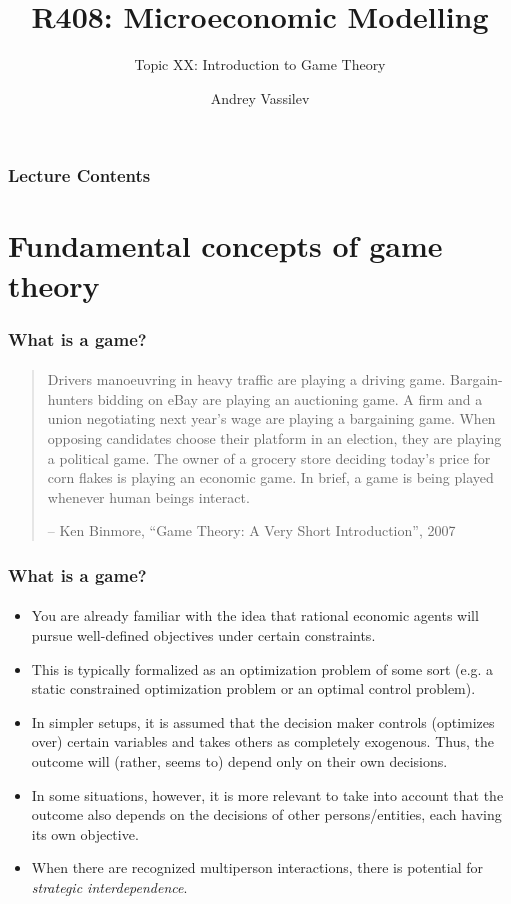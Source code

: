 \documentclass[10pt]{beamer}
\title{R408: Microeconomic Modelling}
\subtitle{Topic XX: \textcolor{myred}{Introduction to Game Theory}}
\author{Andrey Vassilev}
\date{}
\theoremstyle{definition}
\begin{document}
\maketitle

\begin{frame}[fragile]
\frametitle{Lecture Contents}
\tableofcontents
\end{frame} 

\section{Fundamental concepts of game theory}


\begin{frame}[fragile]
\frametitle{What is a game?}
\framesubtitle{}
\begin{quote}
Drivers manoeuvring in heavy traffic are playing a driving game.
Bargain-hunters bidding on eBay are playing an auctioning game.
A firm and a union negotiating next year's wage are playing a
bargaining game. When opposing candidates choose their
platform in an election, they are playing a political game. The
owner of a grocery store deciding today's price for corn flakes is
playing an economic game. In brief, a game is being played
whenever human beings interact.

\begin{flushright}
-- Ken Binmore, ``Game Theory: A Very Short Introduction'', 2007
\end{flushright}
\end{quote}
\end{frame}



\begin{frame}[fragile]
\frametitle{What is a game?}
\framesubtitle{}
\begin{itemize}\itemsep1em
\item You are already familiar with the idea that rational economic agents will pursue well-defined objectives under certain constraints.
\item This is typically formalized as an optimization problem of some sort (e.g. a static constrained optimization problem or an optimal control problem).
\item In simpler setups, it is assumed that the decision maker controls (optimizes over) certain variables and takes others as completely exogenous. Thus, the outcome will (rather, seems to) depend only on their own decisions.
\item In some situations, however, it is more relevant to take into account that the outcome also depends on the decisions of other persons/entities, each having its own objective.
\item When there are recognized multiperson interactions, there is potential for \emph{strategic interdependence}.
\end{itemize}
\end{frame}
\end{document}
